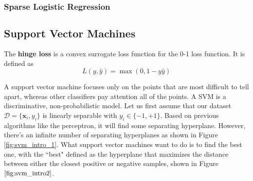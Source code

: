 \documentclass{article}
\begin{document}
    \subsubsection{Sparse Logistic Regression}

  \subsection{Support Vector Machines}

    \begin{definition}
      The \textbf{hinge loss} is a convex surrogate loss function for the 0-1 loss function. It is defined as 
      \begin{equation}
        L(y, \hat{y}) = \max(0, 1 - y \hat{y})
      \end{equation}
    \end{definition}

    A support vector machine focuses only on the points that are most difficult to tell apart, whereas other classifiers pay attention all of the points. A SVM is a discriminative, non-probabilistic model. Let us first assume that our dataset $\mathcal{D} = \{\mathbf{x}_i, y_i\}$ is linearly separable with $y_i \in \{-1, +1\}$. Based on previous algorithms like the perceptron, it will find some separating hyperplane. However, there's an infinite number of separating hyperplanes as shown in Figure \ref{fig:svm_intro_1}. What support vector machines want to do is to find the best one, with the ``best" defined as the hyperplane that maximizes the distance between either the closest positive or negative samples, shown in Figure $\ref{fig:svm_intro2}$.  
\end{document}
